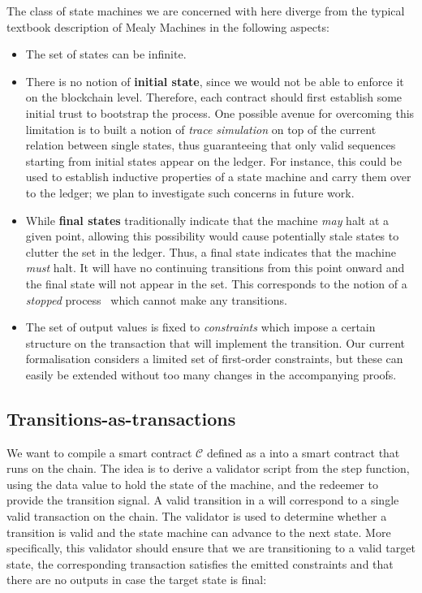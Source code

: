 The class of state machines we are concerned with here diverge from
the typical textbook description of Mealy Machines in the following aspects:
\begin{itemize}
\item The set of states can be infinite.

\item There is no notion of \textbf{initial state}, since we would not
  be able to enforce it on the blockchain level. Therefore, each
  contract should first establish some initial trust to bootstrap the
  process.
  One possible avenue for overcoming this limitation is to built a notion of \textit{trace simulation}
  on top of the current relation between single states,
  thus guaranteeing that only valid sequences starting from initial states appear on the ledger.
  For instance, this could be used to establish inductive properties of a state machine and
  carry them over to the ledger; we plan to investigate such concerns in future work.

\item While \textbf{final states} traditionally indicate that the
  machine \textit{may} halt at a given point, allowing this
  possibility would cause potentially stale states to clutter the \UTXO{}
  set in the ledger. Thus, a \CEM{} final state indicates that the
  machine \textit{must} halt. It will have no continuing transitions
  from this point onward and the final state will not appear in the
  \UTXO{} set. This corresponds to the notion of a \emph{stopped}
  process~\cite{sangiorgi} which cannot make any transitions.

\item The set of output values is fixed to \emph{constraints} which
  impose a certain structure on the transaction that will implement
  the transition.  Our current formalisation considers a limited set
  of first-order constraints, but these can easily be extended without
  too many changes in the accompanying proofs.
\end{itemize}

\subsection{Transitions-as-transactions}

We want to compile a smart contract $\mathcal{C}$ defined as a \CEM{} into
a smart contract that runs on the chain. The idea is to derive a
validator script from the step function, using the data value to hold the
state of the machine, and the redeemer to provide the transition signal.
A valid transition in a \CEM{}
will correspond to a single valid transaction on the chain. The
validator is used to determine whether a transition is valid and the
state machine can advance to the next state. More specifically, this
validator should ensure that we are transitioning to a valid target
state, the corresponding transaction satisfies the emitted constraints
and that there are no outputs in case the target state is final:

